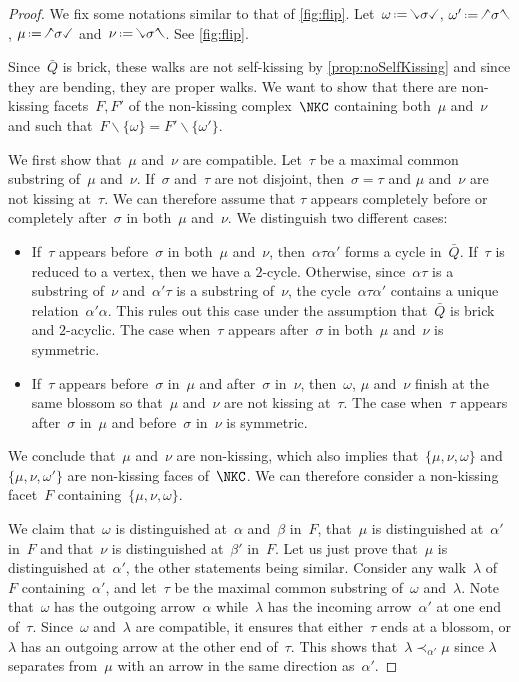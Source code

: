 \documentclass{amsart}
\theoremstyle{definition}
\newcommand{\ssm}{\smallsetminus} %
\newcommand{\eqdef}{\mbox{\,\raisebox{0.2ex}{\scriptsize\ensuremath{\mathrm:}}\ensuremath{=}\,}} %
\newcommand{\quiver}{\bar Q} %
\newcommand{\hL}{\text{\rotatebox[origin=c]{180}{\checked}}}
\newcommand{\hR}{\text{\rotatebox[origin=c]{180}{\reflectbox{\checked}}}}
\newcommand{\cL}{\text{\reflectbox{\checked}}}
\newcommand{\cR}{\text{\checked}}
\newcommand{\hh}[1]{\hL#1\hR} %
\newcommand{\cc}[1]{\cL#1\cR} %
\newcommand{\hc}[1]{\hL#1\cR} %
\newcommand{\ch}[1]{\cL#1\hR} %
\begin{document}
\begin{proof}
We fix some notations similar to that of \cref{fig:flip}.
Let~$\omega \eqdef \cc{\sigma}$, $\omega' \eqdef \hh{\sigma}$, $\mu \eqdef \hc{\sigma}$ and~$\nu \eqdef \ch{\sigma}$.
See \cref{fig:flip}.

Since~$\quiver$ is brick, these walks are not self-kissing by \cref{prop:noSelfKissing} and since they are bending, they are proper walks.
We want to show that there are non-kissing facets~$F, F'$ of the non-kissing complex~$\NKC$ containing both~$\mu$ and~$\nu$ and such that~$F \ssm \{\omega\} = F' \ssm \{\omega'\}$.

We first show that~$\mu$ and~$\nu$ are compatible.
Let~$\tau$ be a maximal common substring of~$\mu$ and~$\nu$.
If~$\sigma$ and~$\tau$ are not disjoint, then~$\sigma = \tau$ and $\mu$ and~$\nu$ are not kissing at~$\tau$.
We can therefore assume that $\tau$ appears completely before or completely after~$\sigma$ in both~$\mu$ and~$\nu$.
We distinguish two different cases:
\begin{itemize}
\item If~$\tau$ appears before~$\sigma$ in both~$\mu$ and~$\nu$, then~$\alpha \tau \alpha'$ forms a cycle in~$\quiver$. If~$\tau$ is reduced to a vertex, then we have a $2$-cycle. Otherwise, since~$\alpha\tau$ is a substring of~$\nu$ and~$\alpha'\tau$ is a substring of~$\nu$, the cycle~$\alpha \tau \alpha'$ contains a unique relation~$\alpha'\alpha$. This rules out this case under the assumption that~$\quiver$ is brick and $2$-acyclic. The case when~$\tau$ appears after~$\sigma$ in both~$\mu$ and~$\nu$ is symmetric.
\item If~$\tau$ appears before~$\sigma$ in~$\mu$ and after~$\sigma$ in~$\nu$, then~$\omega$, $\mu$ and~$\nu$ finish at the same blossom so that~$\mu$ and~$\nu$ are not kissing at~$\tau$. The case when~$\tau$ appears after~$\sigma$ in~$\mu$ and before~$\sigma$ in~$\nu$ is symmetric.
\end{itemize}
We conclude that~$\mu$ and~$\nu$ are non-kissing, which also implies that~$\{\mu, \nu, \omega\}$ and~$\{\mu, \nu, \omega'\}$ are non-kissing faces of~$\NKC$.
We can therefore consider a non-kissing facet~$F$ containing~$\{\mu, \nu, \omega\}$.

We claim that~$\omega$ is distinguished at~$\alpha$ and~$\beta$ in~$F$, that~$\mu$ is distinguished at~$\alpha'$ in~$F$ and that~$\nu$ is distinguished at~$\beta'$ in~$F$.
Let us just prove that~$\mu$ is distinguished at~$\alpha'$, the other statements being similar.
Consider any walk~$\lambda$ of~$F$ containing~$\alpha'$, and let~$\tau$ be the maximal common substring of~$\omega$ and~$\lambda$.
Note that~$\omega$ has the outgoing arrow~$\alpha$ while~$\lambda$ has the incoming arrow~$\alpha'$ at one end of~$\tau$.
Since~$\omega$ and~$\lambda$ are compatible, it ensures that either~$\tau$ ends at a blossom, or $\lambda$ has an outgoing arrow at the other end of~$\tau$.
This shows that~$\lambda \prec_{\alpha'} \mu$ since $\lambda$ separates from~$\mu$ with an arrow in the same direction as~$\alpha'$.


\end{proof}
\end{document}

